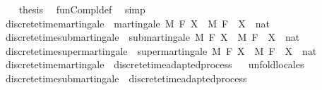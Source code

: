 \begin{isabellebody}
\ \ \isamarkupfalse%
\ {\isacharquery}{\kern0pt}thesis\ \isamarkupfalse%
\ fun{\isacharunderscore}{\kern0pt}Compl{\isacharunderscore}{\kern0pt}def\ \isamarkupfalse%
\ simp\isanewline
{}\isamarkupfalse%
%
\endisatagproof
{\isafoldproof}%
%
\isadelimproof
%
\endisadelimproof
%
\isadelimdocument
%
\endisadelimdocument
%
\isatagdocument
%
\isamarkuptrue%
%
\endisatagdocument
{\isafolddocument}%
%
\isadelimdocument
%
\endisadelimdocument
{}\isamarkupfalse%
\ discrete{\isacharunderscore}{\kern0pt}time{\isacharunderscore}{\kern0pt}martingale\ {\isacharequal}{\kern0pt}\ martingale\ M\ F\ X\ \ M\ F\ \ X\ {\isacharcolon}{\kern0pt}{\isacharcolon}{\kern0pt}\ {\isachardoublequoteopen}nat\ {\isasymRightarrow}\ {\isacharunderscore}{\kern0pt}\ {\isasymRightarrow}\ {\isacharunderscore}{\kern0pt}{\isachardoublequoteclose}\isanewline
{}\isamarkupfalse%
\ discrete{\isacharunderscore}{\kern0pt}time{\isacharunderscore}{\kern0pt}submartingale\ {\isacharequal}{\kern0pt}\ submartingale\ M\ F\ X\ \ M\ F\ \ X\ {\isacharcolon}{\kern0pt}{\isacharcolon}{\kern0pt}\ {\isachardoublequoteopen}nat\ {\isasymRightarrow}\ {\isacharunderscore}{\kern0pt}\ {\isasymRightarrow}\ {\isacharunderscore}{\kern0pt}{\isachardoublequoteclose}\isanewline
{}\isamarkupfalse%
\ discrete{\isacharunderscore}{\kern0pt}time{\isacharunderscore}{\kern0pt}supermartingale\ {\isacharequal}{\kern0pt}\ supermartingale\ M\ F\ X\ \ M\ F\ \ X\ {\isacharcolon}{\kern0pt}{\isacharcolon}{\kern0pt}\ {\isachardoublequoteopen}nat\ {\isasymRightarrow}\ {\isacharunderscore}{\kern0pt}\ {\isasymRightarrow}\ {\isacharunderscore}{\kern0pt}{\isachardoublequoteclose}\isanewline
\isanewline
{}\isamarkupfalse%
\ discrete{\isacharunderscore}{\kern0pt}time{\isacharunderscore}{\kern0pt}martingale\ {\isasymsubseteq}\ discrete{\isacharunderscore}{\kern0pt}time{\isacharunderscore}{\kern0pt}adapted{\isacharunderscore}{\kern0pt}process%
\isadelimproof
\ %
\endisadelimproof
%
\isatagproof
{}\isamarkupfalse%
\ {\isacharparenleft}{\kern0pt}unfold{\isacharunderscore}{\kern0pt}locales{\isacharparenright}{\kern0pt}%
\endisatagproof
{\isafoldproof}%
%
\isadelimproof
%
\endisadelimproof
\isanewline
{}\isamarkupfalse%
\ discrete{\isacharunderscore}{\kern0pt}time{\isacharunderscore}{\kern0pt}submartingale\ {\isasymsubseteq}\ discrete{\isacharunderscore}{\kern0pt}time{\isacharunderscore}{\kern0pt}adapted{\isacharunderscore}{\kern0pt}process%

\end{isabellebody}
